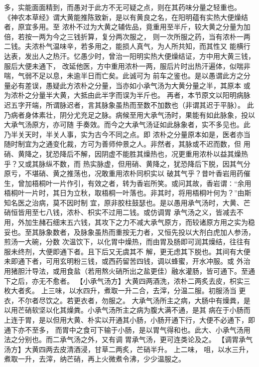 \documentclass[a4paper,12pt,UTF8,twoside]{ctexbook}
\begin{document}
多，实能面面精到，而愚对于此方不无可疑之点，则在其药味分量之轻重也。 
《神农本草经》谓大黄能推陈致新，是以有黄良之名，在阳明蕴有实热大便燥结者，原宜多用。至 
浓朴不过为大黄之辅佐品，竟重用至半斤，较大黄之分量为加倍，若按一两为今之三钱折算，复分两次服之， 
则一次所服之药，当有浓朴一两二钱。夫浓朴气温味辛，若多用之，能损人真气，为人所共知，而其性又 
能横行达表，发出人之热汗。忆愚少时，曾治一阳明实热大便燥结证，方中用大黄三钱，服后大便未通下， 
改延他医，方中重用浓朴一两，服后片时出热汗遍体，似喘非喘，气弱不足以息，未逾半日而亡矣。此诚可为 
前车之鉴也。是以愚谓此方之分量必有差误，愚疑此方浓朴之分量，当亦如小承气汤为大黄分量之半，其原本 
或为浓朴之分量半大黄，大抵由此半字而误为半斤也。 
再者，本节原文以阳明病脉迟五字开端，所谓脉迟者，言其脉象虽热而至数不加数也（非谓其迟于平脉）。 
此乃病者身体素壮，阴分尤充足之脉。病候至用大承气汤时，果能有如此脉象，投以大承气汤原方，亦可随 
手奏效。而今之大承气汤证如此脉象者，实不多见也。此乃半关天时，半关人事，实为古今不同之点。即 
浓朴之分量原本如是，医者亦当随时制宜为之通变化裁，方可为善师仲景之人。非然者，其脉或不迟而数，但 
用硝、黄降之，犹恐降后不解，因阴虚不能胜其燥热也，况更重用浓朴以益其燥热乎？又或其脉纵不数，而 
热实脉虚，但用硝、黄降之，犹恐降后下脱，因其气分原亏，不堪硝、黄之推荡也，况敢重用浓朴同枳实以 
破其气乎？昔叶香岩用药催生，曾加梧桐叶一片作引，有效之者，转为香岩所笑。或问其故，香岩谓∶“余用 
梧桐叶一片时，其日为立秋，取梧桐一叶落也。非其时，将用梧桐叶何为？”由斯知名医之治病，莫不因时制 
宜，原非胶柱鼓瑟也。是以愚用承气汤时，大黄、芒硝恒皆用至七八钱，浓朴、枳实不过用二钱。或仿调胃 
承气汤之义，皆减去不用，外加生赭石细末五六钱，其攻下之力不减大承气原方，而较诸原方用之实为稳 
妥也。至其脉象数者，及脉象虽热而重按无力者，又恒先投以大剂白虎加人参汤，煎汤一大碗，分数 
次温饮下，以化胃中燥热，而由胃及肠即可润其燥结，往往有服未终剂，大便即通下者。且下后又无虞其不 
解，更无虑其下脱也。其间有大便未即通下者，可用玄明粉三钱，或西药留苦四钱，调以蜂蜜，开水冲服。或 
外治用猪胆汁导法，或用食盐（若用熬火硝所出之盐更佳）融水灌肠，皆可通下。至通下之后，亦无不愈者。 
【小承气汤方】大黄四两酒洗，浓朴二两炙去皮，枳实三枚大者炙。 
上三味，以水四升，煮取一升二合，去滓，分温二服。初服汤当 
更衣，不尔者尽饮之。若更衣者，勿服之。 
大承气汤所主之病，大肠中有燥粪，是以用芒硝软坚以化其燥粪。小承气汤所主之病为腹大满不通，是其 
病在于小肠而上连于胃，是以但用大黄、朴实以开通其小肠，小肠开通下行，大便不必通下，即通下亦不至多， 
而胃中之食可下输于小肠，是以胃气得和也。此大、小承气汤用法之分别也。而二承气汤之外，又有调 
胃承气汤，更可连类论及之。 
【调胃承气汤方】大黄四两去皮清酒浸，甘草二两炙，芒硝半升。 
上二味， 咀，以水三升，煮取一升，去滓，纳芒硝，再上火微煮令沸，少少温服之。 
\end{document}

